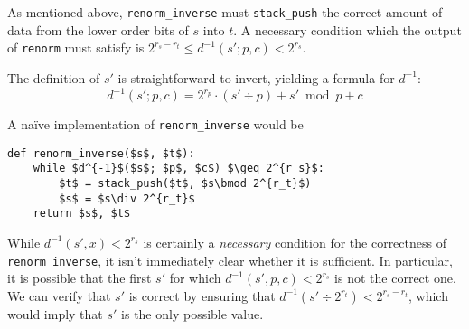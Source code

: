 \documentclass{article}
\begin{document}
As mentioned above, \texttt{renorm\_inverse} must \texttt{stack\_push} the
correct amount of data from the lower order bits of $s$ into $t$. A necessary
condition which the output of \texttt{renorm} must satisfy is $2^{r_s - r_t}
\leq d^{-1}(s'; p, c) < 2^{r_s}$.

The definition of $s'$ is straightforward to invert, yielding a formula for
$d^{-1}$:
\begin{equation}
  d^{-1}(s'; p, c) = 2^{r_p} \cdot (s' \div p) + s' \bmod p + c
\end{equation}

A na\"ive implementation of \texttt{renorm\_inverse} would be
\begin{lstlisting}
def renorm_inverse($s$, $t$):
    while $d^{-1}$($s$; $p$, $c$) $\geq 2^{r_s}$:
        $t$ = stack_push($t$, $s\bmod 2^{r_t}$)
        $s$ = $s\div 2^{r_t}$
    return $s$, $t$
\end{lstlisting}
While $d^{-1}(s', x) < 2^{r_s}$ is certainly a \emph{necessary} condition for
the correctness of \texttt{renorm\_inverse}, it isn't immediately clear whether
it is sufficient. In particular, it is possible that the first $s'$ for which
$d^{-1}(s', p, c) < 2^{r_s}$ is not the correct one. We can verify that $s'$ is
correct by ensuring that $d^{-1}(s'\div2^{r_t}) < 2^{r_s - r_t}$, which would
imply that $s'$ is the only possible value.


\printbibliography
\end{document}
